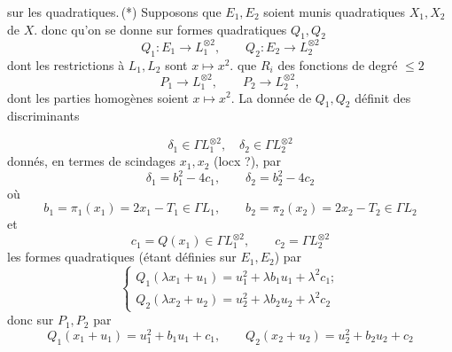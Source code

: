 \documentclass[11pt,a4paper]{article}
\begin{document}
 sur les  quadratiques.\,(*) Supposons que $E_1, E_2$ soient munis \ill{} quadratiques $X_1, X_2$ de $X$. \ill{} donc qu'on se donne sur \ill{} formes quadratiques $Q_1, Q_2$
\[
  Q_1 : E_1 \to L_1^{\otimes 2} , \qquad Q_2 : E_2 \to L_2^{\otimes 2}
\]
dont les restrictions à $L_1, L_2$ sont \struck{\ill{}} $x \mapsto x^2$.  que  $R_i$ des fonctions  de degré $\leq 2$
\[
  P_1 \to L_1^{\otimes 2} , \qquad P_2 \to L_2^{\otimes 2} ,
\]
dont les parties homogènes \struck{\ill{}} soient $x \mapsto x^2$. La donnée de $Q_1, Q_2$ définit des discriminants

\[
  \delta_1 \in \Gamma L_1^{\otimes 2} , \quad \delta_2 \in \Gamma L_2^{\otimes 2}
\]
donnés, en termes de scindages $x_1, x_2$ (locx ?), par
\[
  \delta_1 = b_1^2 - 4c_1 , \qquad \delta_2 = b_2^2 - 4c_2
\]
où
\[
  b_1 = \pi_1(x_1) = 2x_1 - T_1 \in \Gamma L_1 , \qquad b_2 = \pi_2(x_2) = 2x_2 - T_2 \in \Gamma L_2
\]
et
\[
  c_1 = Q(x_1) \in \Gamma L_1^{\otimes 2} , \qquad c_2 = \Gamma L_2^{\otimes 2}
\]
les formes quadratiques (étant définies sur $E_1, E_2$) par
\[
  \begin{cases}
    Q_1(\lambda x_1 + u_1) = u_1^2 + \lambda b_1 u_1 + \lambda^2 c_1 ; \\
    Q_2(\lambda x_2 + u_2) = u_2^2 + \lambda b_2 u_2 + \lambda^2 c_2
  \end{cases}
\]
donc sur $P_1, P_2$ par
\[
  Q_1(x_1 + u_1) = u_1^2 + b_1 u_1 + c_1 , \qquad Q_2(x_2 + u_2) = u_2^2 + b_2 u_2 + c_2
\]
\end{document}
